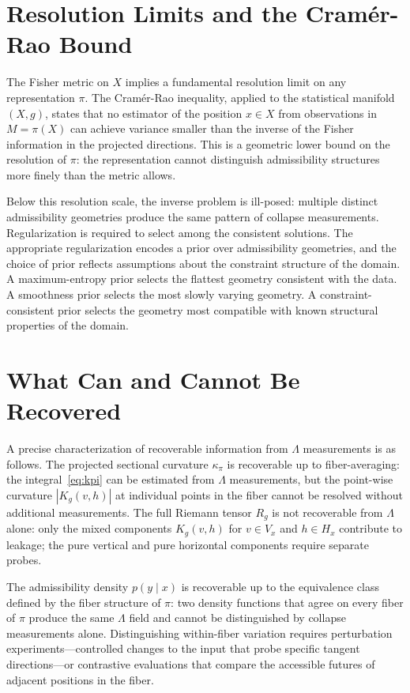 \documentclass[12pt, oneside]{book}
\theoremstyle{plain-flyxion}
\theoremstyle{definition-flyxion}
\newcommand{\kpi}{\kappa_{\pi}}
\newcommand{\Lam}{\Lambda}
\begin{document}
\section{Resolution Limits and the Cramér-Rao Bound}

The Fisher metric on $X$ implies a fundamental resolution limit on any representation
$\pi$. The Cramér-Rao inequality, applied to the statistical manifold $(X,g)$, states
that no estimator of the position $x\in X$ from observations in $M=\pi(X)$ can achieve
variance smaller than the inverse of the Fisher information in the projected directions.
This is a geometric lower bound on the resolution of $\pi$: the representation cannot
distinguish admissibility structures more finely than the metric allows.

Below this resolution scale, the inverse problem is ill-posed: multiple distinct
admissibility geometries produce the same pattern of collapse measurements. Regularization
is required to select among the consistent solutions. The appropriate regularization
encodes a prior over admissibility geometries, and the choice of prior reflects
assumptions about the constraint structure of the domain. A maximum-entropy prior selects
the flattest geometry consistent with the data. A smoothness prior selects the most
slowly varying geometry. A constraint-consistent prior selects the geometry most
compatible with known structural properties of the domain.

\section{What Can and Cannot Be Recovered}

A precise characterization of recoverable information from $\Lam$ measurements is as
follows. The projected sectional curvature $\kpi$ is recoverable up to fiber-averaging:
the integral~\eqref{eq:kpi} can be estimated from $\Lam$ measurements, but the
point-wise curvature $|K_g(v,h)|$ at individual points in the fiber cannot be resolved
without additional measurements. The full Riemann tensor $R_g$ is not recoverable from
$\Lam$ alone: only the mixed components $K_g(v,h)$ for $v\in V_x$ and $h\in H_x$
contribute to leakage; the pure vertical and pure horizontal components require separate
probes.

The admissibility density $p(y\mid x)$ is recoverable up to the equivalence class defined
by the fiber structure of $\pi$: two density functions that agree on every fiber of $\pi$
produce the same $\Lam$ field and cannot be distinguished by collapse measurements alone.
Distinguishing within-fiber variation requires perturbation experiments---controlled
changes to the input that probe specific tangent directions---or contrastive evaluations
that compare the accessible futures of adjacent positions in the fiber.
\end{document}
